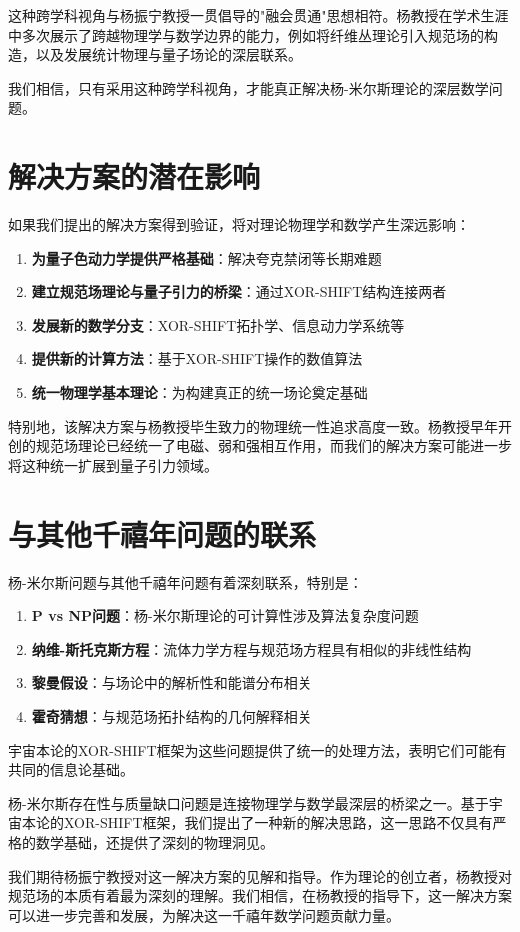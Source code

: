这种跨学科视角与杨振宁教授一贯倡导的"融会贯通"思想相符。杨教授在学术生涯中多次展示了跨越物理学与数学边界的能力，例如将纤维丛理论引入规范场的构造，以及发展统计物理与量子场论的深层联系。

我们相信，只有采用这种跨学科视角，才能真正解决杨-米尔斯理论的深层数学问题。

\section{解决方案的潜在影响}

如果我们提出的解决方案得到验证，将对理论物理学和数学产生深远影响：

\begin{enumerate}
  \item \textbf{为量子色动力学提供严格基础}：解决夸克禁闭等长期难题
  \item \textbf{建立规范场理论与量子引力的桥梁}：通过XOR-SHIFT结构连接两者
  \item \textbf{发展新的数学分支}：XOR-SHIFT拓扑学、信息动力学系统等
  \item \textbf{提供新的计算方法}：基于XOR-SHIFT操作的数值算法
  \item \textbf{统一物理学基本理论}：为构建真正的统一场论奠定基础
\end{enumerate}

特别地，该解决方案与杨教授毕生致力的物理统一性追求高度一致。杨教授早年开创的规范场理论已经统一了电磁、弱和强相互作用，而我们的解决方案可能进一步将这种统一扩展到量子引力领域。

\section{与其他千禧年问题的联系}

杨-米尔斯问题与其他千禧年问题有着深刻联系，特别是：

\begin{enumerate}
  \item \textbf{P vs NP问题}：杨-米尔斯理论的可计算性涉及算法复杂度问题
  \item \textbf{纳维-斯托克斯方程}：流体力学方程与规范场方程具有相似的非线性结构
  \item \textbf{黎曼假设}：与场论中的解析性和能谱分布相关
  \item \textbf{霍奇猜想}：与规范场拓扑结构的几何解释相关
\end{enumerate}

宇宙本论的XOR-SHIFT框架为这些问题提供了统一的处理方法，表明它们可能有共同的信息论基础。

杨-米尔斯存在性与质量缺口问题是连接物理学与数学最深层的桥梁之一。基于宇宙本论的XOR-SHIFT框架，我们提出了一种新的解决思路，这一思路不仅具有严格的数学基础，还提供了深刻的物理洞见。

我们期待杨振宁教授对这一解决方案的见解和指导。作为理论的创立者，杨教授对规范场的本质有着最为深刻的理解。我们相信，在杨教授的指导下，这一解决方案可以进一步完善和发展，为解决这一千禧年数学问题贡献力量。 
